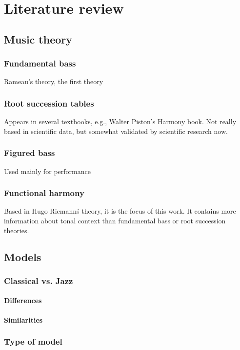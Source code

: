 \normallinespacing

\chapter{Literature review}

\section{Music theory}
  \subsection{Fundamental bass}
  Rameau's theory, the first theory
  \subsection{Root succession tables}
  Appears in several textbooks, e.g., Walter Piston's Harmony book. Not really based in scientific data, but somewhat validated by scientific research now.
  \subsection{Figured bass}
  Used mainly for performance
  \subsection{Functional harmony}
  Based in Hugo Riemann\'s theory, it is the focus of this work. It contains more information about tonal context than fundamental bass or root succession theories.

\section{Models}
  \subsection{Classical vs. Jazz}
    \subsubsection{Differences}
    \subsubsection{Similarities}
  \subsection{Type of model}
